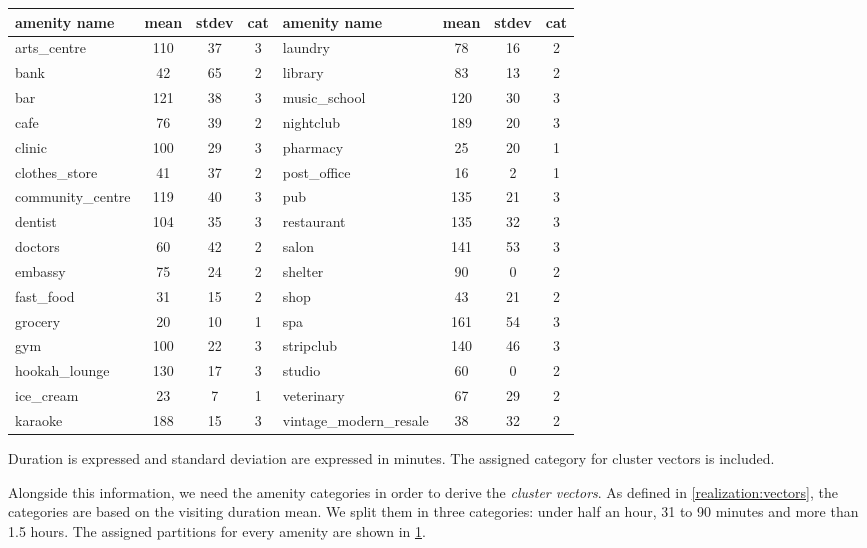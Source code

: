 \begin{table}[!ht]
	{\begin{tabular}{ | l | c | c | c || l | c | c | c |}
		\hline		
		\textbf{amenity name} & \textbf{mean} & \textbf{stdev} & \textbf{cat} & \textbf{amenity name} & \textbf{mean} & \textbf{stdev} & \textbf{cat} \\ \hline
		arts\_centre  & 110 & 37 & 3 & laundry  & 78 & 16 & 2 \\ \hline
		bank  & 42 & 65 & 2 &  library  & 83 & 13 & 2 \\ \hline
		bar  & 121 & 38 & 3 &  music\_school  & 120 & 30 & 3 \\ \hline
		cafe  & 76 & 39 & 2 &  nightclub  & 189 & 20 & 3 \\ \hline
		clinic  & 100 & 29 & 3 &  pharmacy  & 25 & 20 & 1 \\ \hline
		clothes\_store  & 41 & 37 & 2 &  post\_office  & 16 & 2 & 1 \\ \hline
		community\_centre  & 119 & 40 & 3 &  pub  & 135 & 21 & 3 \\ \hline
		dentist  & 104 & 35 & 3 &  restaurant  & 135 & 32 & 3 \\ \hline
		doctors  & 60 & 42 & 2 &  salon  & 141 & 53 & 3 \\ \hline
		embassy  & 75 & 24 & 2 &  shelter  & 90 & 0 & 2 \\ \hline
		fast\_food  & 31 & 15 & 2 &  shop  & 43 & 21 & 2 \\ \hline
		grocery  & 20 & 10 & 1 &  spa  & 161 & 54 & 3 \\ \hline
		gym  & 100 & 22 & 3 &  stripclub  & 140 & 46 & 3 \\ \hline
		hookah\_lounge  & 130 & 17 & 3 &  studio  & 60 & 0 & 2 \\ \hline
		ice\_cream  & 23 & 7 & 1 &  veterinary  & 67 & 29 & 2 \\ \hline
		karaoke  & 188 & 15 & 3 & {\scriptsize vintage\_modern\_resale}  & 38 & 32 & 2 \\ \hline
	\end{tabular}}
	\label{tab:amenities_google_places}
	\begin{tabnote}
		Duration is expressed and standard deviation are expressed in minutes. The assigned category for cluster vectors is included.
	\end{tabnote}
\end{table}

Alongside this information, we need the amenity categories in order to derive the \textit{cluster vectors}.
As defined in \ref{realization:vectors}, the categories are based on the visiting duration mean.
We split them in three categories: under half an hour, 31 to 90 minutes and more than 1.5 hours. 
The assigned partitions for every amenity are shown in \ref{tab:amenities_google_places}. 

